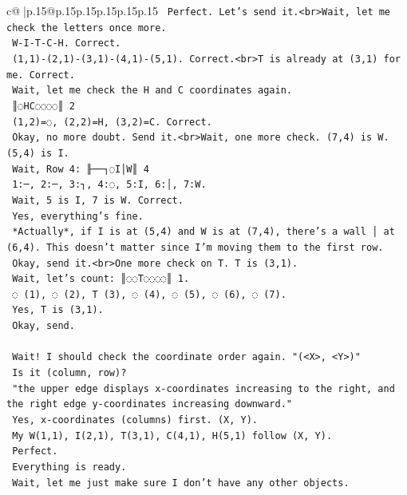 \documentclass{article}
\begin{document}
{\begin{supertabular}{c@{$\;$}|p{.15\linewidth}@{}p{.15\linewidth}p{.15\linewidth}p{.15\linewidth}p{.15\linewidth}p{.15\linewidth}}
{{{\texttt{    Perfect. Let's send it.<br>Wait, let me check the letters once more.} \\
\texttt{    W{-}I{-}T{-}C{-}H. Correct.} \\
\texttt{    (1,1){-}(2,1){-}(3,1){-}(4,1){-}(5,1). Correct.<br>T is already at (3,1) for me. Correct.} \\
\texttt{    Wait, let me check the H and C coordinates again.} \\
\texttt{    ║◌HC◌◌◌◌║ 2} \\
\texttt{    (1,2)=◌, (2,2)=H, (3,2)=C. Correct.} \\
\texttt{    Okay, no more doubt. Send it.<br>Wait, one more check. (7,4) is W. (5,4) is I.} \\
\texttt{    Wait, Row 4: ╟──┐◌I│W║ 4} \\
\texttt{    1:─, 2:─, 3:┐, 4:◌, 5:I, 6:│, 7:W.} \\
\texttt{    Wait, 5 is I, 7 is W. Correct.} \\
\texttt{    Yes, everything's fine.} \\
\texttt{    *Actually*, if I is at (5,4) and W is at (7,4), there's a wall │ at (6,4). This doesn't matter since I'm moving them to the first row.} \\
\texttt{    Okay, send it.<br>One more check on T. T is (3,1).} \\
\texttt{    Wait, let's count: ║◌◌T◌◌◌◌║ 1.} \\
\texttt{    ◌ (1), ◌ (2), T (3), ◌ (4), ◌ (5), ◌ (6), ◌ (7).} \\
\texttt{    Yes, T is (3,1).} \\
\texttt{    Okay, send.} \\
\\ 
\texttt{    Wait! I should check the coordinate order again. "(<X>, <Y>)"} \\
\texttt{    Is it (column, row)?} \\
\texttt{    "the upper edge displays x{-}coordinates increasing to the right, and the right edge y{-}coordinates increasing downward."} \\
\texttt{    Yes, x{-}coordinates (columns) first. (X, Y).} \\
\texttt{    My W(1,1), I(2,1), T(3,1), C(4,1), H(5,1) follow (X, Y).} \\
\texttt{    Perfect.} \\
\texttt{    Everything is ready.} \\
\texttt{    Wait, let me just make sure I don't have any other objects.} \\
}}}
\end{supertabular}}
\end{document}
